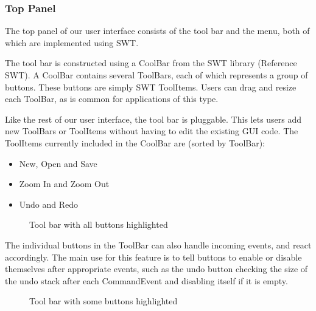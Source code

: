 \documentclass{acm_proc_article-sp}
\begin{document}
\subsubsection{Top Panel}
{
The top panel of our user interface consists of the tool bar and the menu, both of which are implemented using SWT.

The tool bar is constructed using a CoolBar from the SWT library (Reference SWT). A CoolBar contains several ToolBars, each of which represents a group of buttons. These buttons are simply SWT ToolItems. Users can drag and resize each ToolBar, as is common for applications of this type.

Like the rest of our user interface, the tool bar is pluggable. This lets users add new ToolBars or ToolItems without having to edit the existing GUI code. The ToolItems currently included in the CoolBar are (sorted by ToolBar):
\newpage
\begin{itemize}
\item{
New, Open and Save
}
\item{
Zoom In and Zoom Out
}
\item{
Undo and Redo
}
\end{itemize}

\begin{figure}[t]
\centering
{}
\caption{Tool bar with all buttons highlighted}
\label{fig:ui:toolbarall}
\end{figure}

The individual buttons in the ToolBar can also handle incoming events, and react accordingly. The main use for this feature is to tell buttons to enable or disable themselves after appropriate events, such as the undo button checking the size of the undo stack after each CommandEvent and disabling itself if it is empty.

\begin{figure}[t]
\centering
{}
\caption{Tool bar with some buttons highlighted}
\label{fig:ui:toolbarsome}
\end{figure}

}
\end{document}
